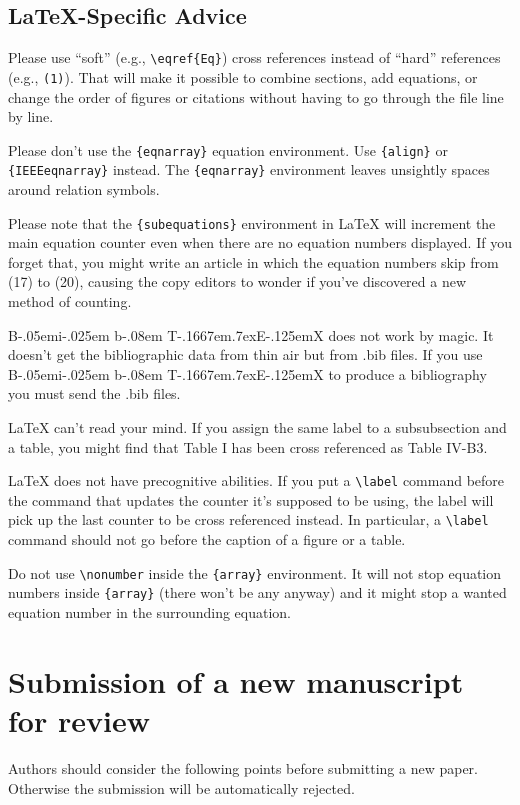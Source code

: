 \documentclass{ieeeojies}
\def\BibTeX{{\rm B\kern-.05em{\sc i\kern-.025em b}\kern-.08em
    T\kern-.1667em\lower.7ex\hbox{E}\kern-.125emX}}
\begin{document}
\subsection{\LaTeX-Specific Advice}

Please use ``soft'' (e.g., \verb|\eqref{Eq}|) cross references instead
of ``hard'' references (e.g., \verb|(1)|). That will make it possible
to combine sections, add equations, or change the order of figures or
citations without having to go through the file line by line.

Please don't use the \verb|{eqnarray}| equation environment. Use
\verb|{align}| or \verb|{IEEEeqnarray}| instead. The \verb|{eqnarray}|
environment leaves unsightly spaces around relation symbols.

Please note that the \verb|{subequations}| environment in {\LaTeX}
will increment the main equation counter even when there are no
equation numbers displayed. If you forget that, you might write an
article in which the equation numbers skip from (17) to (20), causing
the copy editors to wonder if you've discovered a new method of
counting.

{\BibTeX} does not work by magic. It doesn't get the bibliographic
data from thin air but from .bib files. If you use {\BibTeX} to produce a
bibliography you must send the .bib files.

{\LaTeX} can't read your mind. If you assign the same label to a
subsubsection and a table, you might find that Table I has been cross
referenced as Table IV-B3.

{\LaTeX} does not have precognitive abilities. If you put a
\verb|\label| command before the command that updates the counter it's
supposed to be using, the label will pick up the last counter to be
cross referenced instead. In particular, a \verb|\label| command
should not go before the caption of a figure or a table.

Do not use \verb|\nonumber| inside the \verb|{array}| environment. It
will not stop equation numbers inside \verb|{array}| (there won't be
any anyway) and it might stop a wanted equation number in the
surrounding equation.


\section{Submission of a new manuscript for review}
Authors should consider the following points before submitting a new paper. Otherwise the submission will be automatically rejected.
\end{document}
